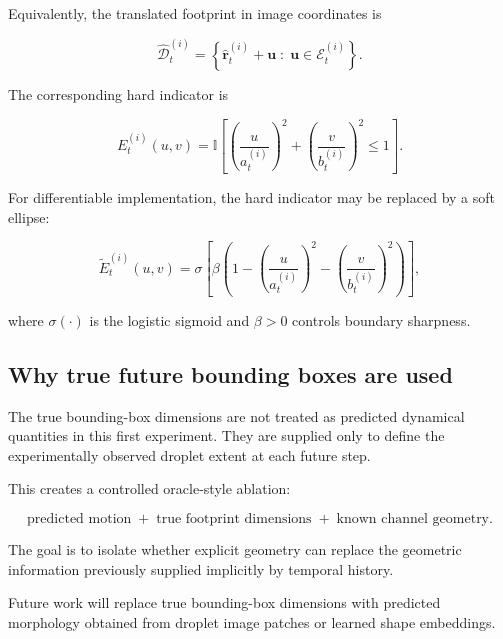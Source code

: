 \documentclass[11pt]{article}
\begin{document}
Equivalently, the translated footprint in image coordinates is

\begin{equation}
    \hat{\mathcal{D}}_{t}^{(i)}
    =
    \left\{
    \hat{\bm{r}}_{t}^{(i)}+\bm{u}
    \;:\;
    \bm{u}\in\mathcal{E}_{t}^{(i)}
    \right\}.
\end{equation}

The corresponding hard indicator is

\begin{equation}
    E_{t}^{(i)}(u,v)
    =
    \mathbb{I}
    \left[
    \left(\frac{u}{a_{t}^{(i)}}\right)^{2}
    +
    \left(\frac{v}{b_{t}^{(i)}}\right)^{2}
    \leq 1
    \right].
\end{equation}

For differentiable implementation, the hard indicator may be replaced by a soft ellipse:

\begin{equation}
    \widetilde{E}_{t}^{(i)}(u,v)
    =
    \sigma
    \left[
    \beta
    \left(
    1
    -
    \left(\frac{u}{a_{t}^{(i)}}\right)^{2}
    -
    \left(\frac{v}{b_{t}^{(i)}}\right)^{2}
    \right)
    \right],
\end{equation}

where $\sigma(\cdot)$ is the logistic sigmoid and $\beta>0$ controls boundary sharpness.

\subsection*{Why true future bounding boxes are used}

The true bounding-box dimensions are not treated as predicted dynamical quantities in this first experiment. They are supplied only to define the experimentally observed droplet extent at each future step.

This creates a controlled oracle-style ablation:

\begin{equation}
    \text{predicted motion}
    \;+\;
    \text{true footprint dimensions}
    \;+\;
    \text{known channel geometry}.
\end{equation}

The goal is to isolate whether explicit geometry can replace the geometric information previously supplied implicitly by temporal history.

Future work will replace true bounding-box dimensions with predicted morphology obtained from droplet image patches or learned shape embeddings.
\end{document}
